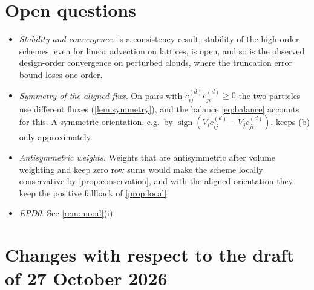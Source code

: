 \documentclass[11pt,a4paper]{article}
\theoremstyle{plain}
\theoremstyle{definition}
\theoremstyle{remark}
\numberwithin{equation}{section}
\newcommand{\sgn}{\operatorname{sign}}
\begin{document}
\section{Open questions}\label{sec:open}

\begin{itemize}
\item \emph{Stability and convergence.}  is a consistency result; stability of the high-order schemes, even for linear advection on lattices, is open, and so is the observed design-order convergence on perturbed clouds, where the truncation error bound loses one order.
\item \emph{Symmetry of the aligned flux.} On pairs with $c^{(d)}_{ij}c^{(d)}_{ji}\ge0$ the two particles use different fluxes (\cref{lem:symmetry}), and the balance \eqref{eq:balance} accounts for this. A symmetric orientation, e.g.\ by $\sgn(V_ic^{(d)}_{ij}-V_jc^{(d)}_{ji})$, keeps (b) only approximately.
\item \emph{Antisymmetric weights.} Weights that are antisymmetric after volume weighting and keep zero row sums would make the scheme locally conservative by \cref{prop:conservation}, and with the aligned orientation they keep the positive fallback of \cref{prop:local}.
\item \emph{EPD0.} See \cref{rem:mood}(i).
\end{itemize}

\appendix
\section{Changes with respect to the draft of 27 October 2026}\label{app:changes}
\end{document}
